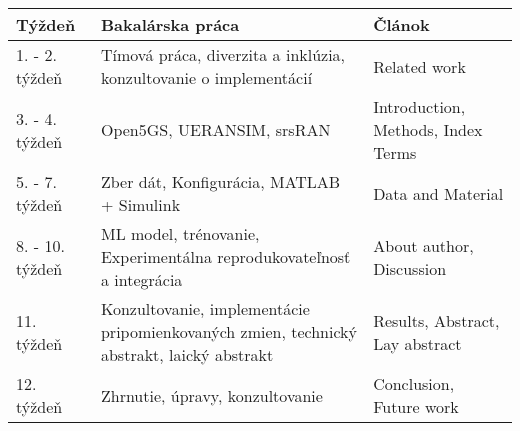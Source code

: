 \begin{tabular}{|p{3cm}||p{6.1cm}||p{4.1cm}|}
\hline
Týždeň & Bakalárska práca & Článok \\
\hline
1. - 2. týždeň & Tímová práca, diverzita a inklúzia, konzultovanie o implementácií & Related work  \\
\hline
3. - 4. týždeň & Open5GS, UERANSIM, srsRAN & Introduction, Methods, Index Terms \\
\hline
5. - 7.  týždeň  & Zber dát, Konfigurácia, MATLAB + Simulink & Data and Material  \\
\hline
8. - 10. týždeň & ML model, trénovanie, Experimentálna reprodukovateľnosť a integrácia & About author, Discussion  \\
\hline
11. týždeň & Konzultovanie, implementácie pripomienkovaných zmien, technický abstrakt, laický abstrakt & Results, Abstract, Lay abstract  \\
\hline
12. týždeň &  Zhrnutie, úpravy, konzultovanie & Conclusion, Future work \\
\hline
\end{tabular}
